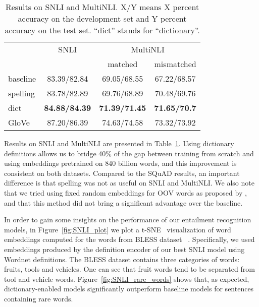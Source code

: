 \begin{table}
\caption{\label{tab:snli_results}Results on SNLI and MultiNLI. X/Y means X percent accuracy on the development set and Y percent accuracy on the test set. ``dict'' stands for ``dictionary''.
}
\centering
\begin{tabular}{lccc}
\toprule
 & SNLI & \multicolumn{2}{c}{MultiNLI} \\
{} &      &  matched & mismatched \\
\midrule
baseline        &  83.39/82.84 &  69.05/68.55 & 67.22/68.57 \\
\midrule
spelling   &  83.78/82.89 &  69.76/68.89 & 70.48/69.76  \\
dict            &  \textbf{84.88/84.39} & \textbf{71.39/71.45} & \textbf{71.65/70.7} \\
\midrule
GloVe           &  87.20/86.39 & 74.63/74.58 & 73.32/73.92 \\
\bottomrule
\end{tabular}
\end{table}



Results on SNLI and MultiNLI are presented in Table~\ref{tab:snli_results}. Using dictionary definitions allows us to bridge 40\% of the gap between training from scratch and using embeddings pretrained on 840 billion words, and this improvement is consistent on both datasets. Compared to the SQuAD results, an important difference is that spelling was not as useful on SNLI and MultiNLI. We also note that we tried using fixed random embeddings for OOV words as proposed by \citep{dhingra_comparative_2017}, and that this method did not bring a significant advantage over the baseline.

In order to gain some insights on the performance of our entailment recognition models, in Figure~\ref{fig:SNLI_plot} we plot a t-SNE~\citep{maaten2008visualizing} visualization of word embeddings computed for the words from BLESS dataset ~\citep{Baroni:2011:WBD:2140490.2140491}. Specifically, we used embeddings produced by the definition encoder of our best SNLI model using Wordnet definitions. The BLESS dataset contains three categories of words: fruits, tools and vehicles.
One can see that fruit words tend to be separated from tool and vehicle words. 
Figure~\ref{fig:SNLI_rare_words} shows that, as expected, dictionary-enabled models significantly outperform baseline models for sentences containing rare words. 

